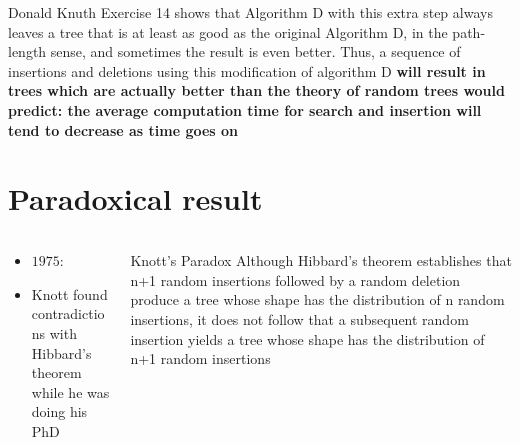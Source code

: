 \documentclass{beamer}
\begin{document}
\begin{frame}
    \begin{block}{Donald Knuth}
        Exercise 14 shows that Algorithm D with this extra step always leaves a tree that is at least as good as the original
        Algorithm D, in the path-length sense, and sometimes the result is even better. Thus, a sequence of insertions and deletions using
        this modification of algorithm D \textbf{will result in trees which are actually better than the theory of random trees would predict: the
        average computation time for search and insertion will tend to decrease as time goes on}
    \end{block}
\end{frame}

\section{Paradoxical result}

\begin{frame}
    
\begin{columns}[c]
    \begin{column}{0.5\textwidth}
     \begin{itemize}
         \item $1975$: \cite{knott1975deletion}
             \pause
         \item Knott found contradictions with Hibbard's theorem while he was doing his PhD
     \end{itemize}
    \end{column}
    \begin{column}{0.5\textwidth}
        \begin{center}
             \pause
            \begin{block}{Knott's Paradox}
                Although Hibbard’s theorem establishes that n+1 random insertions
                followed by a random deletion produce a tree whose shape has the distribution of n random insertions, it does not follow that a
                subsequent random insertion yields a tree whose shape has the distribution of n+1 random insertions
            \end{block}
        \end{center}
    \end{column}
    
\end{columns}
\end{frame}
\end{document}
